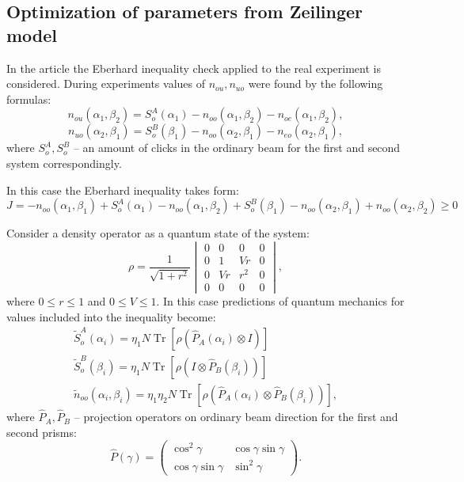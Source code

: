 \documentclass[%
master,         %
subf,           %
href,           %
colorlinks=true %
]{disser}
\DeclareMathOperator{\Tr}{Tr}
\numberwithin{equation}{section}
\numberwithin{figure}{section}
\begin{document}
\clearpage

\subsection{Optimization of parameters from Zeilinger model}
In the article \cite{Zeilinger} the Eberhard inequality check applied to the real experiment is considered. 
During experiments values of $n_{ou}, n_{uo}$  were found by the following formulas:
\[
n_{ou}(\alpha_1, \beta_2) = S_o^A(\alpha_1) - n_{oo}(\alpha_1, \beta_2) - n_{oe}(\alpha_1, \beta_2),
\]
\[
n_{uo}(\alpha_2, \beta_1) = S_o^B(\beta_1) - n_{oo}(\alpha_2, \beta_1) - n_{eo}(\alpha_2, \beta_1),
\]
where $S_o^A, S_o^B$ -- an amount of clicks in the ordinary beam for the first and second system 
correspondingly.

In this case the Eberhard inequality takes form:
\begin{equation}
J = -n_{oo}(\alpha_1, \beta_1) + S_o^A(\alpha_1) - n_{oo}(\alpha_1, \beta_2) + S_o^B(\beta_1) - n_{oo}(\alpha_2, \beta_1) + n_{oo}(\alpha_2, \beta_2) \geq 0
\label{eq:Zeilinger_J}
\end{equation}

Consider a density operator as a quantum state of the system:
\[
\rho = \frac{1}{\sqrt{1+r^2}}
\begin{vmatrix}
0 & 0 & 0 & 0\\
0 & 1 & Vr & 0\\
0 & Vr & r^2 & 0\\
0 & 0 & 0 & 0
\end{vmatrix},
\]
where $0 \leq r \leq 1$ and $0 \leq V \leq 1$.
In this case predictions of quantum mechanics for values included into the inequality become:
\begin{eqnarray*}
\tilde{S}_o^A(\alpha_i) = \eta_1 N \Tr[\rho(\hat{P}_A(\alpha_i) \otimes I)]\\
\tilde{S}_o^B(\beta_i) = \eta_1 N \Tr[\rho(I \otimes \hat{P}_B(\beta_i))]\\
\tilde{n}_{oo}(\alpha_i, \beta_i) = \eta_1\eta_2 N \Tr[\rho(\hat{P}_A(\alpha_i) \otimes \hat{P}_B(\beta_i))],
\end{eqnarray*}
where $\hat{P}_A, \hat{P}_B$ -- projection operators on ordinary beam direction for the first and second prisms:
\[
\hat{P}(\gamma) = 
\begin{pmatrix}
\cos^2\gamma & \cos\gamma\sin\gamma\\
\cos\gamma\sin\gamma & \sin^2\gamma
\end{pmatrix}.
\]
\end{document}
